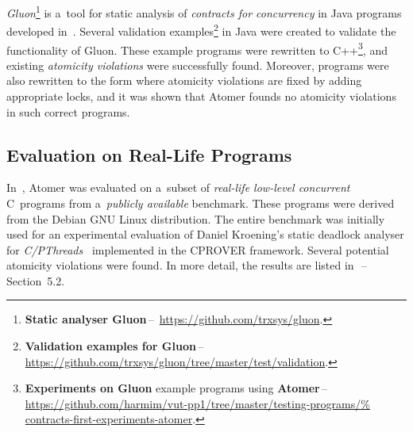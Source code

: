 \emph{Gluon}\footnote{\textbf{Static analyser Gluon}\,--\,%
\url{https://github.com/trxsys/gluon}.} is a~tool for static analysis of
\emph{contracts for concurrency} in Java programs developed
in~\cite{contracts2015, contracts2017}. Several validation examples\footnote{%
\textbf{Validation examples for Gluon}\,--\,%
\url{https://github.com/trxsys/gluon/tree/master/test/validation}.} in Java
were created to validate the functionality of Gluon. These example programs were
rewritten to C++\footnote{\textbf{Experiments on Gluon} example programs using
\textbf{Atomer}\,--\,%
\url{https://github.com/harmim/vut-pp1/tree/master/testing-programs/%
contracts-first-experiments-atomer}.}, and existing \emph{atomicity violations}
were successfully found. Moreover, programs were also rewritten to the form
where atomicity violations are fixed by adding appropriate locks, and it was
shown that Atomer founds no atomicity violations in such correct programs.

\subsection{Evaluation on Real-Life Programs}
\label{sec:expReal}

In~\cite{harmimBP}, Atomer was evaluated on a~subset of \emph{real-life
low-level concurrent} C~programs from a~\emph{publicly available} benchmark.
These programs were derived from the Debian GNU Linux distribution. The entire
benchmark was initially used for an experimental evaluation of Daniel
Kroening's static deadlock analyser for
\emph{C/PThreads}~\cite{deadlockKroening} implemented in the CPROVER framework.
Several potential atomicity violations were found. In more detail, the results
are listed in~\cite{harmimBP}\,--\,Section~5.2.

